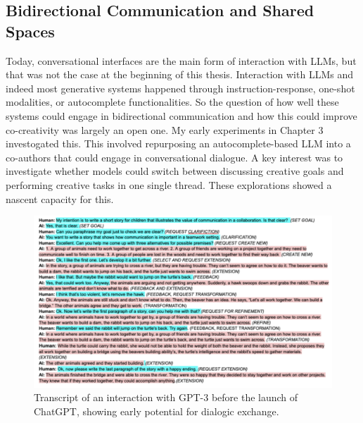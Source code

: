 \subsection{Bidirectional Communication and Shared Spaces}
Today, conversational interfaces are the main form of interaction with LLMs, but that was not the case at the beginning of this thesis. Interaction with LLMs and indeed most generative systems happened through instruction-response, one-shot modalities, or autocomplete functionalities. So the question of how well these systems could engage in bidirectional communication and how this could improve co-creativity was largely an open one.  My early experiments in Chapter 3 investogated this. This involved repurposing an autocomplete-based LLM into a co-authors that could engage in conversational dialogue. A key interest was to investigate whether models could switch between discussing creative goals and performing creative tasks in one single thread. These explorations showed a nascent capacity for this.
\begin{figure}[H]
    \centering
    \includegraphics[width=1\linewidth]{transcriptgenchi.png}
    \caption{Transcript of an interaction with GPT-3 before the launch of ChatGPT, showing early potential for dialogic exchange.}
    \label{fig:genchi_transcript}
\end{figure}

